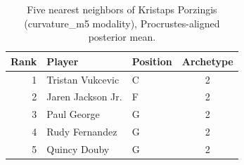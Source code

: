 \begin{table}[htbp]
  \centering\small
  \begin{tabular}{rllc}
    \toprule
    Rank & Player & Position & Archetype \\
    \midrule
    1 & Tristan Vukcevic & C & 2 \\
    2 & Jaren Jackson Jr. & F & 2 \\
    3 & Paul George & G & 2 \\
    4 & Rudy Fernandez & G & 2 \\
    5 & Quincy Douby & G & 2 \\
    \bottomrule
  \end{tabular}
  \caption{Five nearest neighbors of Kristaps Porzingis (curvature_m5 modality), Procrustes-aligned posterior mean.}
  \label{tab:Kristaps_Porzingis_neighbors_curvature_m5}
\end{table}

